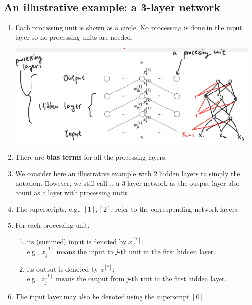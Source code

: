 \documentclass[11pt]{article}
\begin{document}
\subsection{An illustrative example: a 3-layer network}
\begin{enumerate}
\item Each processing unit is shown as a circle. No processing is done in the input layer so no processing units are needed.
\begin{center}
\includegraphics[scale=0.5]{img/FNN2.png}
\end{center}
\item There are \textbf{bias terms} for all the processing layers.
\item We consider here an illustrative example with 2 hidden layers to simply the notation. However, we still call it a 3-layer network as the output layer also count as a layer with processing units.
\item The superscripts, e.g., $[1], [2]$, refer to the corresponding network layers.
\item For each processing unit, 
\begin{enumerate}
\item its (summed) input is denoted by $x^{[*]}$;\\ e.g., $x^{[1]}_{j}$ means the input to $j$-th unit in the first hidden layer.
\item its output is denoted by $z^{[*]}$;\\ e.g., $z^{[1]}_{j}$ means the output from $j$-th unit in the first hidden layer.
\end{enumerate}
\item The input layer may also be denoted using the superscript $[0]$.
\end{enumerate}
\end{document}
